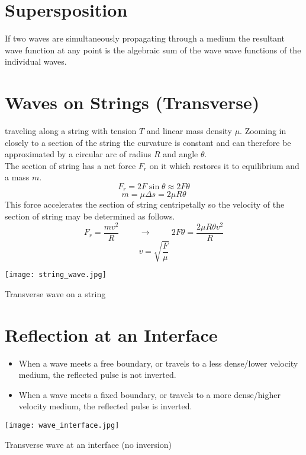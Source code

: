  \section{Supersposition}
 If two waves are simultaneously propagating through a medium the resultant wave function at any point is the algebraic sum of the wave wave functions of the individual waves.
 
 \section{Waves on Strings (Transverse)}
  traveling along a string with tension $T$ and linear mass density $\mu$.  Zooming in closely to a section of the string the curvature is constant and can therefore be approximated by a circular arc of radius $R$ and angle $\theta$.  \\
The section of string has a net force $F_r$ on it which restores it to equilibrium and a mass $m$.
$$F_r=2F\sin\theta\approx 2F\theta$$
$$m=\mu \Delta s= 2\mu R \theta$$
This force accelerates the section of string centripetally so the velocity of the section of string may be determined as follows.
$$F_r=\frac{mv^2}{R} \hspace{1cm} \longrightarrow \hspace{1cm} 2F\theta=\frac{2\mu R \theta v^2}{R}$$
$$v=\sqrt{\frac{F}{\mu}}$$

\begin{marginfigure}[-220pt]
  \texttt{[image: string\_wave.jpg]}
  \caption{Transverse wave on a string}
  \label{fig:marginfig}
\end{marginfigure}

 \section{Reflection at an Interface}
 
 \begin{itemize}
\item When a wave meets a free boundary, or travels to a less dense/lower velocity medium,  the reflected pulse is not inverted.
\item When a wave meets a fixed boundary, or travels to a more dense/higher velocity medium, the reflected pulse is inverted. 
\end{itemize}

\begin{marginfigure}[0pt]
  \texttt{[image: wave\_interface.jpg]}
  \caption{Transverse wave at an interface (no inversion)}
  \label{fig:marginfig}
\end{marginfigure}

